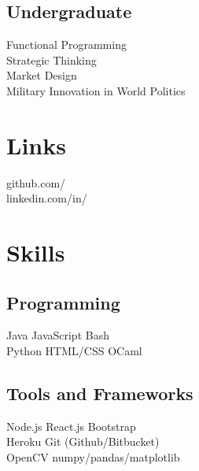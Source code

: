 \documentclass[]{deedy-resume-openfont}
\begin{document}
\begin{minipage}[t]{0.33\textwidth}
\subsection{Undergraduate}
Functional Programming \\
Strategic Thinking\\
Market Design \\
Military Innovation in World Politics

\sectionsep


\section{Links} 
github.com/\href{https://github.com/kuang}{} \\
linkedin.com/in/\href{https://www.linkedin.com/in/kuangjustin}{} \\
\sectionsep

\section{Skills}
\subsection{Programming}
Java \textbullet{}   JavaScript \textbullet{} Bash \\
Python \textbullet{} HTML/CSS \textbullet OCaml
\newline
\newline

\subsection{Tools and Frameworks}
Node.js \textbullet{}   React.js \textbullet{} 
Bootstrap \textbullet{} \\
Heroku \textbullet{} 
Git (Github/Bitbucket) \\
OpenCV \textbullet numpy/pandas/matplotlib


\end{minipage}
\end{document}
